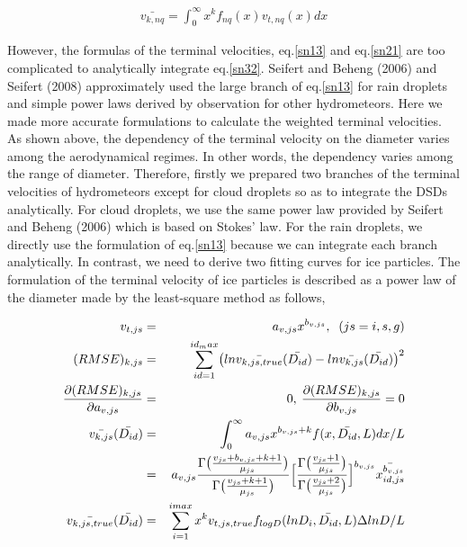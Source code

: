\begin{eqnarray}
\bar{v_{k,nq}}=\int_{0}^{\infty}x^{k}f_{nq}(x)v_{t,nq}(x)dx
\label{sn32}
\end{eqnarray}

However, the formulas of the terminal velocities, eq.\ref{sn13} and eq.\ref{sn21} are too complicated to analytically integrate eq.\ref{sn32}. Seifert and Beheng (2006) and Seifert (2008) approximately used the large branch of eq.\ref{sn13} for rain droplets and simple power laws derived by observation for other hydrometeors. Here we made more accurate formulations to calculate the weighted terminal velocities.\\
As shown above, the dependency of the terminal velocity on the diameter varies among the aerodynamical regimes. In other words, the dependency varies among the range of diameter. Therefore, firstly we prepared two branches of the terminal velocities of hydrometeors except for cloud droplets so as to integrate the DSDs analytically. For cloud droplets, we use the same power law provided by Seifert and Beheng (2006) which is based on Stokes’ law. For the rain droplets, we directly use the formulation of eq.\ref{sn13} because we can integrate each branch analytically. In contrast, we need to derive two fitting curves for ice particles. The formulation of the terminal velocity of ice particles is described as a power law of the diameter made by the least-square method as follows,

\begin{eqnarray}
v_{t,js}&=&a_{v,js}x^{b_{v,js}},\;\;(js=i,s,g)\label{sn33}\\
(RMSE)_{k,js}&=&\sum_{id=1}^{id_max}\bigl(ln\bar{v_{k,js,true}}(\bar{D_{id}})-ln\bar{v_{k,js}}(\bar{D_{id}})\bigr)^{2}\label{sn34}\\
\frac{\partial(RMSE)_{k,js}}{\partial a_{v,js}}&=&0,\:\frac{\partial (RMSE)_{k,js}}{\partial b_{v,js}}=0\nonumber\\
\bar{v_{k,js}}(\bar{D_{id}})&=&\int_{0}^{\infty}a_{v,js}x^{b_{v,js}+k}f(x,\bar{D_{id}},L)dx/L\nonumber\\
&=&a_{v,js}\frac{\Gamma\bigl(\frac{v_{js}+b_{v,js}+k+1}{\mu_{js}}\bigr)}{\Gamma\bigl(\frac{v_{js}+k+1}{\mu_{js}}\bigr)}
\Bigl[\frac{\Gamma\bigl(\frac{v_{js}+1}{\mu_{js}}\bigr)}{\Gamma\bigl(\frac{v_{js}+2}{\mu_{js}}\bigr)}\Bigr]^{b_{v,js}}\bar{x_{id,js}^{b_{v,js}}}\label{sn35}\\
\bar{v_{k,js,true}}(\bar{D_{id}})&=&\sum_{i=1}^{imax}x^{k}v_{t,js,true}f_{logD}(lnD_{i},\bar{D_{id}},L)\Delta ln D/L\nonumber
\end{eqnarray}

